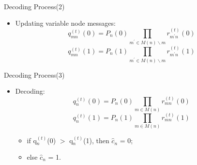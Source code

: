 \def\CTeXPreproc{Created by ctex v0.2.12, don't edit!}\documentclass{beamer}
\begin{document}
\begin{frame}
    \begin{block}{Decoding Process(2)}
        \begin{itemize}
        \item Updating variable node messages:\begin{equation*}
                                              q_{mn}^{(t)}(0)=P_n(0)\prod_{m^\prime\in M(n)\backslash m}r_{m^\prime n}^{(t)}(0)
                                              \end{equation*}
                                              \begin{equation*}
                                              q_{mn}^{(t)}(1)=P_n(1)\prod_{m^\prime\in M(n)\backslash m}r_{m^\prime n}^{(t)}(1)
                                              \end{equation*}
        \end{itemize}
    \end{block}
\end{frame}
\begin{frame}
    \begin{block}{Decoding Process(3)}
        \begin{itemize}
        \item Decoding:\begin{equation*}
                                              q_{n}^{(t)}(0)=P_n(0)\prod_{m\in M(n)}r_{mn}^{(t)}(0)
                                              \end{equation*}
                                              \begin{equation*}
                                              q_{n}^{(t)}(1)=P_n(1)\prod_{m\in M(n)}r_{mn}^{(t)}(1)
                                              \end{equation*}
                                              \begin{itemize}
                                              \item if q$_{n}^{(t)}$(0) $>$ q$_{n}^{(t)}$(1), then $\hat{c}_n$ = 0;
                                              \item else $\hat{c}_n$ = 1.
                                              \end{itemize}
        \end{itemize}
    \end{block}
\end{frame}
\end{document}
